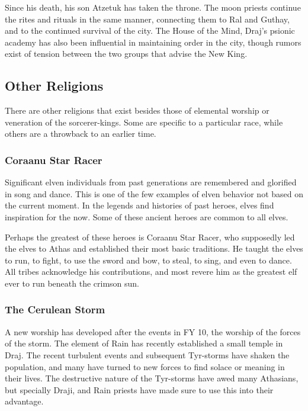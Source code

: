 Since his death, his son Atzetuk has taken the throne. The moon priests continue the rites and rituals in the same manner, connecting them to Ral and Guthay, and to the continued survival of the city. The House of the Mind, Draj's psionic academy has also been influential in maintaining order in the city, though rumors exist of tension between the two groups that advise the New King.

\subsection{Other Religions}
There are other religions that exist besides those of elemental worship or veneration of the sorcerer-kings. Some are specific to a particular race, while others are a throwback to an earlier time.

\subsubsection{Coraanu Star Racer}
Significant elven individuals from past generations are remembered and glorified in song and dance. This is one of the few examples of elven behavior not based on the current moment. In the legends and histories of past heroes, elves find inspiration for the now. Some of these ancient heroes are common to all elves.

Perhaps the greatest of these heroes is Coraanu Star Racer, who supposedly led the elves to Athas and established their most basic traditions. He taught the elves to run, to fight, to use the sword and bow, to steal, to sing, and even to dance. All tribes acknowledge his contributions, and most revere him as the greatest elf ever to run beneath the crimson sun.

\subsubsection{The Cerulean Storm}
A new worship has developed after the events in FY 10, the worship of the forces of the storm. The element of Rain has recently established a small temple in Draj. The recent turbulent events and subsequent Tyr-storms have shaken the population, and many have turned to new forces to find solace or meaning in their lives. The destructive nature of the Tyr-storms have awed many Athasians, but specially Draji, and Rain priests have made sure to use this into their advantage.

